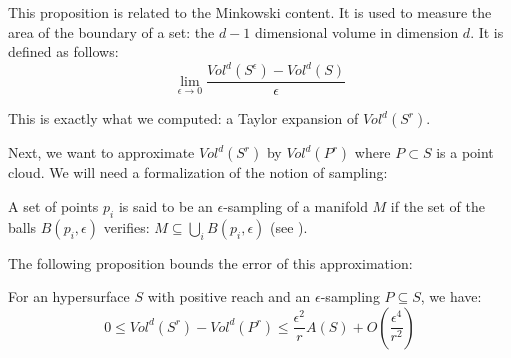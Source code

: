 This proposition is related to the Minkowski content. It is used to measure the
area of the boundary of a set: the $ d-1 $ dimensional volume in dimension $ d
$. It is defined as follows:
$$ \lim\limits_{\epsilon \to 0} \frac{Vol^d(S^{\epsilon}) - Vol^d(S)}{\epsilon} $$

This is exactly what we computed: a Taylor expansion of $ Vol^d(S^r) $.

Next, we want to approximate $ Vol^d(S^r) $ by $ Vol^d(P^r) $ where $ P \subset
S $ is a point cloud. We will need a formalization of the notion of sampling:

\begin{definition}
    A set of points $ p_i $ is said to be an $\epsilon$-sampling of a manifold $
    M $ if the set of the balls  $ B(p_i, \epsilon) $ verifies: $ M \subseteq
    \bigcup_i B(p_i, \epsilon) $ (see \cite{amenta1999surface}).
\end{definition}

The following proposition bounds the error of this approximation:

\begin{proposition}
    \label{prop:comp-vol-offsets}
    For an hypersurface $ S $ with positive reach and an $\epsilon$-sampling $ P
    \subseteq S $, we have:
    \begin{equation}
        0 \leq Vol^d(S^r) - Vol^d(P^r) \leq \frac{\epsilon^2}{r} A(S) +
        O(\frac{\epsilon^4}{r^2})
    \end{equation}
\end{proposition}

